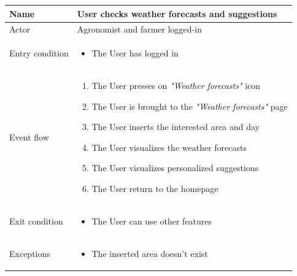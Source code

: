 \begin{table}[H]
    \begin{tabu} to \textwidth {|X|X[4]|}
        \hline
        Name            & User checks weather forecasts and suggestions           \\ \hline
        Actor           & Agronomist and farmer logged-in    \\ \hline
        Entry condition & \begin{itemize}
            \item The User has logged in
        \end{itemize} \\ \hline
        Event flow      & \begin{enumerate}
            \item The User presses on \emph{"Weather forecasts"} icon
            \item The User is brought to the \emph{"Weather forecasts"} page
            \item The User inserts the interested area and day
            \item The User visualizes the weather forecasts
            \item The User visualizes personalized suggestions
            \item The User return to the homepage
        \end{enumerate} \\ \hline
        Exit condition  & \begin{itemize}
            \item The User can use other features
        \end{itemize} \\ \hline
        Exceptions      & \begin{itemize}
            \item The inserted area doesn't exist
        \end{itemize} \\ \hline
    \end{tabu}
\end{table}

